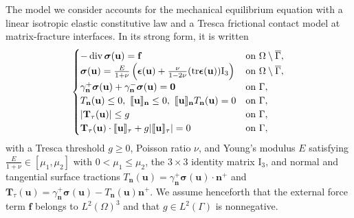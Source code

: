 \documentclass[a4paper,11pt]{article}
\theoremstyle{definition}
\theoremstyle{remark}
\newcommand{\bo}[1]{\mathbf{#1}}
\newcommand{\bos}[1]{\boldsymbol{#1}}
\def\bsig{\boldsymbol{\sigma}}
\def\be{\boldsymbol{\epsilon}}
\newcommand{\Id}{\mathrm{I}_3}
\def\sjump#1{[\hskip -1.5pt[#1]\hskip -1.5pt]}
\def\O{\Omega}
\def\tr{{\rm {tr}}}
\newcommand{\bspace}{\O\setminus\overline{\Gamma}}
\newcommand{\DIV}{\operatorname{\mathrm{div}}}
\begin{document}
The model we consider accounts for the mechanical equilibrium equation with a linear isotropic elastic constitutive law and a Tresca frictional contact model at matrix-fracture interfaces. In its strong form, it is written
\begin{equation}\label{eq:strong_form}
\begin{cases}
-\DIV\bsig(\bo{u})=\bo{f} & \text{on}~\bspace,\\
\bsig(\bo{u})=\frac{E}{1+\nu} \left(\be( \bo{u})+\frac{\nu}{1-2\nu}(\tr \be(\bo{u}))\Id\right)& \text{on}~\bspace,\\
\gamma_{\bo{n}}^+\bos{\sigma}(\bo{u}) + \gamma_{\bo{n}}^-\bos{\sigma}(\bo{u})=\bo{0}& \text{on}~\Gamma,\\
T_{\bo{n}}(\bo{u})\leq 0,~\sjump{\bo{u}}_{\bo{n}}\leq 0,~\sjump{\bo{u}}_{\bo{n}}T_{\bo{n}}(\bo{u})=0&\text{on}~\Gamma,\\
\lvert \bo{T}_{\tau}(\bo{u})\rvert\leq g&\text{on }\Gamma,\\
\bo{T}_{\tau}(\bo{u})\cdot\sjump{\bo{u}}_\tau+g\lvert \sjump{\bo{u}}_\tau\rvert=0&\text{on }\Gamma,
\end{cases}
\end{equation}
with a Tresca threshold $g\geq 0$, Poisson ratio $\nu$, and Young’s modulus $E$ satisfying $\frac{E}{1+\nu}\in [\mu_{1},\mu_{2}]$ with $0 < \mu_{1} \leq\mu_{2}$, the $3\times 3$ identity matrix $\Id$, and normal and tangential surface tractions $T_{\bo{n}}(\bo{u})=\gamma_{\bo{n}}^+\bos{\sigma}(\bo{u})\cdot\bo{n}^+$ and $\bo{T}_\tau(\bo{u})=\gamma_{\bo{n}}^+\bos{\sigma}(\bo{u})-T_{\bo{n}}(\bo{u})\bo{n}^+$. We assume henceforth that the external force term $\bo{f}$ belongs to $L^2(\O)^3$ and that $g\in L^2(\Gamma)$ is nonnegative.
\end{document}
